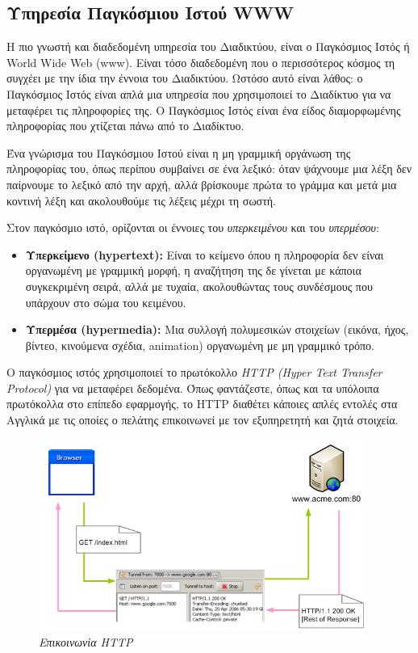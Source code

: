 %
%

\subsection{Υπηρεσία Παγκόσμιου Ιστού WWW}

Η πιο γνωστή και διαδεδομένη υπηρεσία του Διαδικτύου, είναι ο Παγκόσμιος Ιστός ή World Wide Web (www). Είναι τόσο διαδεδομένη που ο περισσότερος κόσμος τη συγχέει με την ίδια την έννοια του Διαδικτύου. Ωστόσο αυτό είναι λάθος: ο Παγκόσμιος Ιστός είναι απλά μια υπηρεσία που χρησιμοποιεί το Διαδίκτυο για να μεταφέρει τις πληροφορίες της. Ο Παγκόσμιος Ιστός είναι ένα είδος διαμορφωμένης πληροφορίας που χτίζεται πάνω από το Διαδίκτυο.

Ένα γνώρισμα του Παγκόσμιου Ιστού είναι η μη γραμμική οργάνωση της πληροφορίας του, όπως περίπου συμβαίνει σε ένα λεξικό: όταν ψάχνουμε μια λέξη δεν παίρνουμε το λεξικό από την αρχή, αλλά βρίσκουμε πρώτα το γράμμα και μετά μια κοντινή λέξη και ακολουθούμε τις λέξεις μέχρι τη σωστή.

Στον παγκόσμιο ιστό, ορίζονται οι έννοιες του \emph{υπερκειμένου} και του \emph{υπερμέσου}:

\begin{itemize}
\item \textbf{Υπερκείμενο (hypertext):} Είναι το κείμενο όπου  η πληροφορία δεν είναι οργανωμένη με γραμμική μορφή, η αναζήτηση της δε γίνεται με κάποια συγκεκριμένη σειρά, αλλά με τυχαία, ακολουθώντας τους συνδέσμους που υπάρχουν στο σώμα του κειμένου.
\item \textbf{Υπερμέσα (hypermedia):} Μια συλλογή πολυμεσικών στοιχείων (εικόνα, ήχος, βίντεο, κινούμενα σχέδια, animation) οργανωμένη με μη γραμμικό τρόπο.
\end{itemize}

Ο παγκόσμιος ιστός χρησιμοποιεί το πρωτόκολλο \emph{HTTP (Hyper Text Transfer Pro\-to\-col)} για να μεταφέρει δεδομένα. Όπως φαντάζεστε, όπως και τα υπόλοιπα πρωτόκολλα στο επίπεδο εφαρμογής, το HTTP διαθέτει κάποιες απλές εντολές στα Αγγλικά με τις οποίες ο πελάτης επικοινωνεί με τον εξυπηρετητή και ζητά στοιχεία.

\begin{figure}[!ht]
 \centering
 \includegraphics[width=0.95\textwidth]{images/chapter6/6-11}
 \caption {\textsl{Επικοινωνία HTTP}}
 \label{6-11}
\end{figure}


